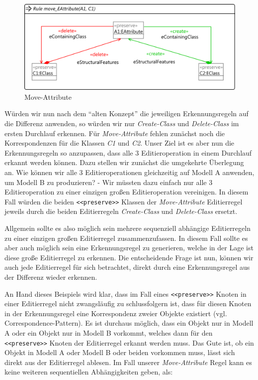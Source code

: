 \begin{figure}[htb]
  \centering
  \includegraphics[width=1.0\textwidth]{img/move_eattribute_execute.png}
  \caption{Move-Attribute}
  \label{fig:Move-Attribute}
\end{figure}

Würden wir nun nach dem "`alten Konzept"' die jeweiligen Erkennungsregeln auf die Differenz
anwenden, so würden wir nur \textit{Create-Class} und \textit{Delete-Class} im ersten Durchlauf
erkennen. Für \textit{Move-Attribute} fehlen zunächst noch die Korrespondenzen für die Klassen
\textit{C1} und \textit{C2}. Unser Ziel ist es aber nun die Erkennungsregeln so anzupassen, dass
alle 3 Editieroperation in einem Durchlauf erkannt werden können. Dazu stellen wir zunächst die
umgekehrte Überlegung an. Wie können wir alle 3 Editieroperationen gleichzeitig auf Modell A
anwenden, um Modell B zu produzieren? - Wir müssten dazu einfach nur alle 3 Editieroperation zu
einer einzigen großen Editieroperation vereinigen. In diesem Fall würden die beiden
\texttt{<<preserve>>} Klassen der \textit{Move-Attribute} Editierregel jeweils durch die beiden
Editierregeln \textit{Create-Class} und \textit{Delete-Class} ersetzt.

Allgemein sollte es also möglich sein mehrere sequenziell abhängige Editierregeln zu einer einzigen
großen Editierregel zusammenzufassen. In diesem Fall sollte es aber auch möglich sein eine
Erkennungsregel zu generieren, welche in der Lage ist diese große Editierregel zu erkennen. Die
entscheidende Frage ist nun, können wir auch jede Editierregel für sich betrachtet, direkt durch
eine Erkennungsregel aus der Differenz wieder erkennen. 

An Hand dieses Beispiels wird klar, dass im Fall eines \texttt{<<preserve>>} Knoten in einer
Editierregel nicht zwangsläufig zu schlussfolgern ist, dass für diesen Knoten in der Erkennungsregel
eine Korrespondenz zweier Objekte existiert (vgl. Correspondence-Pattern). Es ist durchaus möglich,
dass ein Objekt nur in Modell A oder ein Objekt nur in Modell B vorkommt, welches dann für den
\texttt{<<preserve>>} Knoten der Editierregel erkannt werden muss. Das Gute ist, ob ein Objekt in
Modell A oder Modell B oder beiden vorkommen muss, lässt sich direkt aus der Editierregel ablesen.
Im Fall unserer \textit{Move-Attribute} Regel kann es keine weiteren sequentiellen Abhängigkeiten
geben, als: 

